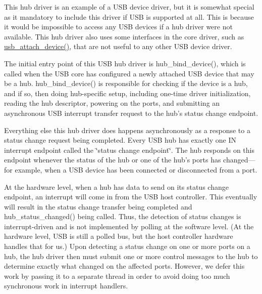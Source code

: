 This hub driver is an example of a U\-S\-B device driver, but it is somewhat special as it mandatory to include this driver if U\-S\-B is supported at all. This is because it would be impossible to access any U\-S\-B devices if a hub driver were not available. This hub driver also uses some interfaces in the core driver, such as \hyperlink{group__usbcore_ga42564b27159fcf3073738ad16e9aa287}{usb\-\_\-attach\-\_\-device()}, that are not useful to any other U\-S\-B device driver.

The initial entry point of this U\-S\-B hub driver is hub\-\_\-bind\-\_\-device(), which is called when the U\-S\-B core has configured a newly attached U\-S\-B device that may be a hub. hub\-\_\-bind\-\_\-device() is responsible for checking if the device is a hub, and if so, then doing hub-\/specific setup, including one-\/time driver initialization, reading the hub descriptor, powering on the ports, and submitting an asynchronous U\-S\-B interrupt transfer request to the hub's status change endpoint.

Everything else this hub driver does happens asynchronously as a response to a status change request being completed. Every U\-S\-B hub has exactly one I\-N interrupt endpoint called the \char`\"{}status change endpoint\char`\"{}. The hub responds on this endpoint whenever the status of the hub or one of the hub's ports has changed--- for example, when a U\-S\-B device has been connected or disconnected from a port.

At the hardware level, when a hub has data to send on its status change endpoint, an interrupt will come in from the U\-S\-B host controller. This eventually will result in the status change transfer being completed and hub\-\_\-status\-\_\-changed() being called. Thus, the detection of status changes is interrupt-\/driven and is not implemented by polling at the software level. (At the hardware level, U\-S\-B is still a polled bus, but the host controller hardware handles that for us.) Upon detecting a status change on one or more ports on a hub, the hub driver then must submit one or more control messages to the hub to determine exactly what changed on the affected ports. However, we defer this work by passing it to a separate thread in order to avoid doing too much synchronous work in interrupt handlers. 

